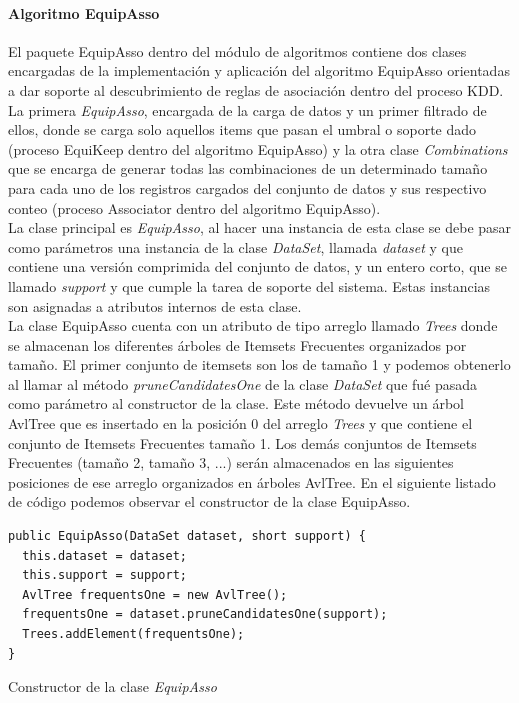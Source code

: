 \paragraph{Algoritmo EquipAsso}
El paquete EquipAsso dentro del m\'odulo de algoritmos contiene dos clases encargadas de la implementaci\'on y
aplicaci\'on del algoritmo EquipAsso orientadas a dar soporte al descubrimiento de reglas de asociaci\'on dentro 
del proceso KDD. La primera \textit{EquipAsso}, encargada de la carga de datos y un primer filtrado de ellos,
donde se carga solo aquellos items que pasan el umbral o soporte dado (proceso EquiKeep dentro del
algoritmo EquipAsso) y la otra clase \textit{Combinations} que se encarga de generar todas las combinaciones de
un determinado tama\~no para cada uno de los registros cargados del conjunto de datos y sus respectivo conteo
(proceso Associator dentro del algoritmo EquipAsso).\\

La clase principal es \textit{EquipAsso}, al hacer una instancia de esta clase se debe pasar como par\'ametros
una instancia de la clase \textit{DataSet}, llamada \textit{dataset} y que contiene una versi\'on comprimida del
conjunto de datos, y un entero corto, que se llamado \textit{support} y que cumple la tarea de soporte del
sistema.  Estas instancias son asignadas a atributos internos de esta clase.\\

La clase EquipAsso cuenta con un atributo de tipo arreglo llamado \textit{Trees} donde se almacenan los
diferentes \'arboles de Itemsets Frecuentes organizados por tama\~no.  El primer conjunto de itemsets son los de
tama\~no 1 y podemos obtenerlo al llamar al m\'etodo \textit{pruneCandidatesOne} de la clase \textit{DataSet} que
fu\'e pasada como par\'ametro al constructor de la clase.  Este m\'etodo devuelve un \'arbol AvlTree que es
insertado en la posici\'on 0 del arreglo \textit{Trees} y que contiene el conjunto de Itemsets Frecuentes
tama\~no 1. Los dem\'as conjuntos de Itemsets Frecuentes (tama\~no 2, tama\~no 3, ...) ser\'an almacenados en las
siguientes posiciones de ese arreglo organizados en \'arboles AvlTree.  En el siguiente listado de c\'odigo
podemos observar el constructor de la clase EquipAsso.\\

\begin{codigof}[!h]
\begin{verbatim}
public EquipAsso(DataSet dataset, short support) {
  this.dataset = dataset;
  this.support = support;
  AvlTree frequentsOne = new AvlTree();
  frequentsOne = dataset.pruneCandidatesOne(support);
  Trees.addElement(frequentsOne);
}
\end{verbatim}
\caption{Constructor de la clase \textit{EquipAsso}}
\end{codigof}


